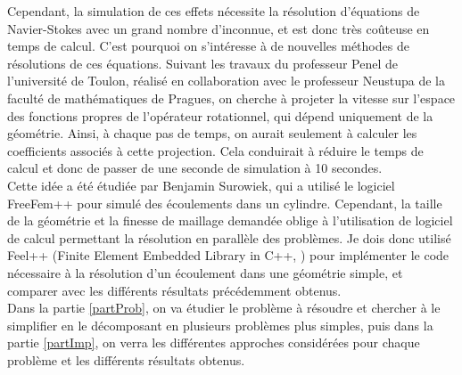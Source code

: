 Cependant, la simulation de ces effets nécessite la résolution d'équations de Navier-Stokes avec un grand nombre d'inconnue, et est donc très coûteuse en temps de calcul. C'est pourquoi on s'intéresse à de nouvelles méthodes de résolutions de ces équations. Suivant les travaux \cite{Penel2004} du professeur Penel de l'université de Toulon, réalisé en collaboration avec le professeur Neustupa de la faculté de mathématiques de Pragues, on cherche à projeter la vitesse sur l'espace des fonctions propres de l'opérateur rotationnel, qui dépend uniquement de la géométrie. Ainsi, à chaque pas de temps, on aurait seulement à calculer les coefficients associés à cette projection. Cela conduirait à réduire le temps de calcul et donc de passer de une seconde de simulation à 10 secondes.\\

Cette idée a été étudiée par Benjamin Surowiek, qui a utilisé le logiciel FreeFem++ pour simulé des écoulements dans un cylindre. Cependant, la taille de la géométrie et la finesse de maillage demandée oblige à l'utilisation de logiciel de calcul permettant la résolution en parallèle des problèmes. Je dois donc utilisé Feel++ (Finite Element Embedded Library in C++, \cite{PRUDHOMME:2012:HAL-00662868:3,feelpp098:10046} ) pour implémenter le code nécessaire à la résolution d'un écoulement dans une géométrie simple, et comparer avec les différents résultats précédemment obtenus.\\

Dans la partie \ref{partProb}, on va étudier le problème à résoudre et chercher à le simplifier en le décomposant en plusieurs problèmes plus simples, puis dans la partie \ref{partImp}, on verra les différentes approches considérées pour chaque problème et les différents résultats obtenus.

